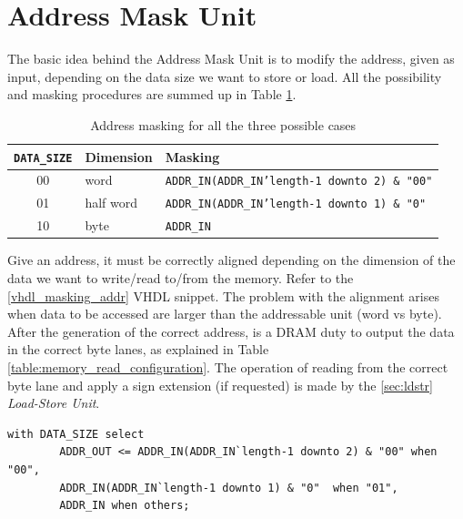 \section{Address Mask Unit}
The basic idea behind the Address Mask Unit is to modify the address, given as input, depending on the data size we want to store or load. All the possibility and masking procedures are summed up in Table \ref{tab:addr_masking}. 

\begin{table}[ht]
    \begin{center}
        \begin{tabular}{ c| l | l}
            \texttt{DATA\_SIZE} & \textbf{Dimension} & \textbf{Masking}\\
            \hline
            00 & word & \texttt{ADDR\_IN(ADDR\_IN'length-1 downto 2) \& "00"}\\
            01 & half word & \texttt{ADDR\_IN(ADDR\_IN'length-1 downto 1) \& "0"} \\
            10 & byte & \texttt{ADDR\_IN}
            
        \end{tabular}
        \caption{Address masking for all the three possible cases}
        \label{tab:addr_masking}
    \end{center}
\end{table}


Give an address, it must be correctly aligned depending on the dimension of the data we want to write/read to/from the memory. Refer to the \ref{vhdl_masking_addr} VHDL snippet. The problem with the alignment arises when data to be accessed are larger than the addressable unit (word vs byte). \\

After the generation of the correct address, is a DRAM duty to output the data in the correct byte lanes, as explained in Table \ref{table:memory_read_configuration}. The operation of reading from the correct byte lane and apply a sign extension (if requested) is made by the \ref{sec:ldstr} \emph{Load-Store Unit}.



\hfill
\begin{lstlisting}[style=vhdl,caption={VHDL code for address alignment},label=vhdl_masking_addr]
    with DATA_SIZE select
        ADDR_OUT <= ADDR_IN(ADDR_IN`length-1 downto 2) & "00" when "00",
        ADDR_IN(ADDR_IN`length-1 downto 1) & "0"  when "01",
        ADDR_IN when others;
\end{lstlisting}

